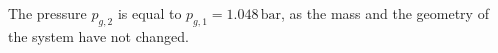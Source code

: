 The pressure \( p_{g,2} \) is equal to \( p_{g,1} = 1.048 \, \text{bar} \), as the mass and the geometry of the system have not changed.